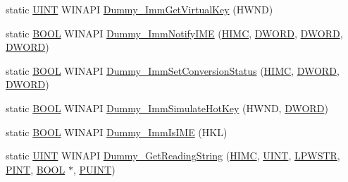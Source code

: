 \begin{DoxyCompactItemize}
\item 
static \hyperlink{class_c_d_x_u_t_i_m_e_edit_box_a7c83b549328a07897bdac88bb0ac4d68}{UINT} WINAPI \hyperlink{class_c_d_x_u_t_i_m_e_edit_box_a27d9701b01e3dd2f619bfed972a20c84}{Dummy\_\-ImmGetVirtualKey} (HWND)
\item 
static \hyperlink{class_c_d_x_u_t_i_m_e_edit_box_ad2239c74ad7d59cbb8e6d2b5bf17bcb8}{BOOL} WINAPI \hyperlink{class_c_d_x_u_t_i_m_e_edit_box_ac1aa6446ec3d96e8dd281a66d99d2aea}{Dummy\_\-ImmNotifyIME} (\hyperlink{class_c_d_x_u_t_i_m_e_edit_box_aa9afdec726ecd526e2a0abc01537426c}{HIMC}, \hyperlink{class_c_d_x_u_t_i_m_e_edit_box_a4666fce9b285d692ceb0515bf2dbde90}{DWORD}, \hyperlink{class_c_d_x_u_t_i_m_e_edit_box_a4666fce9b285d692ceb0515bf2dbde90}{DWORD}, \hyperlink{class_c_d_x_u_t_i_m_e_edit_box_a4666fce9b285d692ceb0515bf2dbde90}{DWORD})
\item 
static \hyperlink{class_c_d_x_u_t_i_m_e_edit_box_ad2239c74ad7d59cbb8e6d2b5bf17bcb8}{BOOL} WINAPI \hyperlink{class_c_d_x_u_t_i_m_e_edit_box_a4fbcb1ed6d0f08f1a2149e86af71c8a6}{Dummy\_\-ImmSetConversionStatus} (\hyperlink{class_c_d_x_u_t_i_m_e_edit_box_aa9afdec726ecd526e2a0abc01537426c}{HIMC}, \hyperlink{class_c_d_x_u_t_i_m_e_edit_box_a4666fce9b285d692ceb0515bf2dbde90}{DWORD}, \hyperlink{class_c_d_x_u_t_i_m_e_edit_box_a4666fce9b285d692ceb0515bf2dbde90}{DWORD})
\item 
static \hyperlink{class_c_d_x_u_t_i_m_e_edit_box_ad2239c74ad7d59cbb8e6d2b5bf17bcb8}{BOOL} WINAPI \hyperlink{class_c_d_x_u_t_i_m_e_edit_box_a91ad4dfb9e1f2e4194557a36989de3d6}{Dummy\_\-ImmSimulateHotKey} (HWND, \hyperlink{class_c_d_x_u_t_i_m_e_edit_box_a4666fce9b285d692ceb0515bf2dbde90}{DWORD})
\item 
static \hyperlink{class_c_d_x_u_t_i_m_e_edit_box_ad2239c74ad7d59cbb8e6d2b5bf17bcb8}{BOOL} WINAPI \hyperlink{class_c_d_x_u_t_i_m_e_edit_box_a0429a5b7c90ab227fc79d0e82f61db9d}{Dummy\_\-ImmIsIME} (HKL)
\item 
static \hyperlink{class_c_d_x_u_t_i_m_e_edit_box_a7c83b549328a07897bdac88bb0ac4d68}{UINT} WINAPI \hyperlink{class_c_d_x_u_t_i_m_e_edit_box_a54618d363797a91b5e1f42da21f66c82}{Dummy\_\-GetReadingString} (\hyperlink{class_c_d_x_u_t_i_m_e_edit_box_aa9afdec726ecd526e2a0abc01537426c}{HIMC}, \hyperlink{class_c_d_x_u_t_i_m_e_edit_box_a7c83b549328a07897bdac88bb0ac4d68}{UINT}, \hyperlink{class_c_d_x_u_t_i_m_e_edit_box_ab64b30f7dfad94f5fdffbe58821da2ff}{LPWSTR}, \hyperlink{class_c_d_x_u_t_i_m_e_edit_box_a96f42b574c3273edb514d6490a7fee62}{PINT}, \hyperlink{class_c_d_x_u_t_i_m_e_edit_box_ad2239c74ad7d59cbb8e6d2b5bf17bcb8}{BOOL} $\ast$, \hyperlink{class_c_d_x_u_t_i_m_e_edit_box_a0bcfcce05c77e66c32a46c02ae6bbed0}{PUINT})

\end{DoxyCompactItemize}

